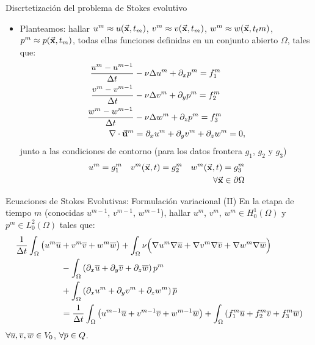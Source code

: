 \documentclass[9pt, dvipsnames,]{beamer}
\newcommand{\Vtest}{\ensuremath{V_0}}
\begin{document}
\begin{frame}{Discrtetización del problema de Stokes evolutivo}

  \begin{itemize}

  \item Planteamos: hallar $u^m\approx u(\vec{\mathbf{x}},t_m)$, $v^m\approx v(\vec{\mathbf{x}},t_m)$, $w^m\approx w(\vec{\mathbf{x}},t_tm)$, $p^m\approx p(\vec{\mathbf{x}},t_m)$, todas ellas funciones definidas en un conjunto
    abierto $\Omega$, tales que:
    \begin{align}
      \frac{u^m - u^{m-1}}{\Delta t} &- \nu\Delta u^m + \partial_x p^m = f^m_1
      \\
      \frac{v^m - v^{m-1}}{\Delta t} &- \nu\Delta v^m + \partial_y p^m = f^m_2
      \\
      \frac{w^m - w^{m-1}}{\Delta t} &- \nu\Delta w^m + \partial_z p^m = f^m_3
      \\
      \nabla\cdot{}\vec{\mathbf{u}}^m &= \partial_x u^m + \partial_y v^m + \partial_z w^m = 0,
    \end{align}
    junto a las condiciones de contorno (para los datos frontera $g_1$, $g_2$ y $g_3$)
    \begin{align}
      u^m=g_1^m
      \quad
      v^m(\vec{\mathbf{x}},t)=g_2^m
      \quad
      w^m(\vec{\mathbf{x}},t)=g_3^m
      \\
    \forall \vec{\mathbf{x}}\in\partial\Omega
    \end{align}
  \end{itemize}

\end{frame}

\begin{frame}{Ecuaciones de Stokes Evolutivas: Formulación variacional (II)}
  En la etapa de tiempo $m$ (conocidas $u^{m-1}$, $v^{m-1}$, $w^{m-1}$), hallar $u^m$, $v^m$, $w^m \in H^1_0(\Omega)$ y $p^m\in L_0^2(\Omega)$ tales que:
    \begin{align*}
      \frac{1}{\Delta t} \int_\Omega\big(
      u^m \overline u
      &+ {v^m} \overline v
      + {w^m} \overline w
      \big)
      + \int_\Omega \nu\Big( \nabla u^m \nabla \overline u +
      \nabla v^m\nabla \overline v + \nabla w^m\nabla \overline w \Big)
      \\
      &- \int_\Omega \left( \partial_x \overline u + \partial_y \overline v + \partial_z \overline w \right) p^m
      \\
      &+ \int_\Omega \left( \partial_x u^m + \partial_y v^m  + \partial_z w^m \right) \overline {p}
      \\
      &=
      \frac{1}{\Delta t} \int_\Omega\big(
      u^{m-1} \overline u
      + {v^{m-1}} \overline v
      + {w^{m-1}} \overline w
      \big)
       + \int_\Omega \left( f^m_1 \overline u + f^m_2 \overline v + f^m_3 \overline w \right)
    \end{align*}
    $\forall \bu,\bv, \bw\in \Vtest$, $\forall\overline {p}\in Q$.

\end{frame}
\end{document}
